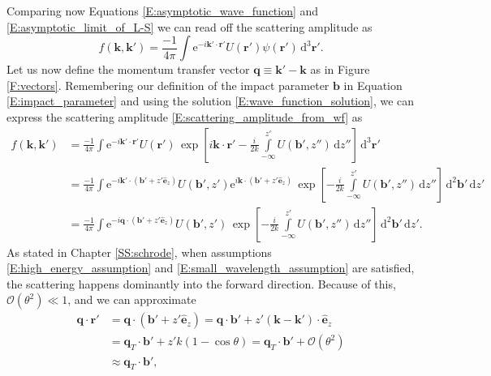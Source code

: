 \documentclass[a4paper, twoside, english, 12pt]{report}
\begin{document}
Comparing now Equations \eqref{E:asymptotic_wave_function} and \eqref{E:asymptotic_limit_of_L-S} we can read off the scattering amplitude as
\begin{equation}\label{E:scattering_amplitude_from_wf}
	f(\mathbf{k},\mathbf{k'}) = \frac{-1}{4\pi}\int \text{e}^{-i\mathbf{k'}\cdot\mathbf{r'}}U(\mathbf{r'})\psi(\mathbf{r'})\,\text{d}^3\mathbf{r'}.
\end{equation}
Let us now define the momentum transfer vector $\mathbf{q}\equiv\mathbf{k'}-\mathbf{k}$ as in Figure \ref{F:vectors}. Remembering our definition of the impact parameter $\mathbf{b}$ in Equation \eqref{E:impact_parameter} and using the solution \eqref{E:wave_function_solution}, we can express the scattering amplitude \eqref{E:scattering_amplitude_from_wf} as 
\begin{align}\label{E:scattering_amplitude_incomplete}
	f(\mathbf{k},\mathbf{k'}) &=\frac{-1}{4\pi}\int \text{e}^{-i\mathbf{k'}\cdot\mathbf{r'}}U(\mathbf{r'})\, \exp\left[i\mathbf{k}\cdot\mathbf{r'}-\frac{i}{2k}\int\limits^{z'}_{-\infty} U(\mathbf{b'},z'')\,\text{d}z''\right]\,\text{d}^3\mathbf{r'} \nonumber \\
	 &=\frac{-1}{4\pi}\int \text{e}^{-i\mathbf{k'}\cdot\left(\mathbf{b'}+z'\hat{\mathbf{e}}_z\right)}U(\mathbf{b'},z') \text{e}^{i\mathbf{k}\cdot\left(\mathbf{b'}+z'\hat{\mathbf{e}}_z\right)} \, \exp\left[-\frac{i}{2k}\int\limits^{z'}_{-\infty} U(\mathbf{b'},z'')\,\text{d}z''\right]\,\text{d}^2\mathbf{b'}\,\text{d}z' \nonumber \\
	 &=\frac{-1}{4\pi}\int \text{e}^{-i\mathbf{q}\cdot\left(\mathbf{b'}+z'\hat{\mathbf{e}}_z\right)}U(\mathbf{b'},z') \, \exp\left[-\frac{i}{2k}\int\limits^{z'}_{-\infty} U(\mathbf{b'},z'')\,\text{d}z''\right]\,\text{d}^2\mathbf{b'}\,\text{d}z'.
\end{align}
As stated in Chapter \ref{SS:schrode}, when assumptions \eqref{E:high_energy_assumption} and \eqref{E:small_wavelength_assumption} are satisfied, the scattering happens dominantly into the forward direction. Because of this, $\mathcal{O}(\theta^2)\ll 1$, and we can approximate
\begin{align*}
	\mathbf{q}\cdot\mathbf{r'} &= \mathbf{q}\cdot\left(\mathbf{b'}+z'\hat{\mathbf{e}}_z\right) = \mathbf{q}\cdot\mathbf{b'} + z'(\mathbf{k-k'})\cdot\hat{\mathbf{e}}_z\\
	&= \mathbf{q}_T\cdot\mathbf{b'} + z'k(1-\cos\theta)= \mathbf{q}_T\cdot\mathbf{b'} + \mathcal{O}(\theta^2)\\ &\approx \mathbf{q}_T\cdot\mathbf{b'},
\end{align*}
\end{document}
